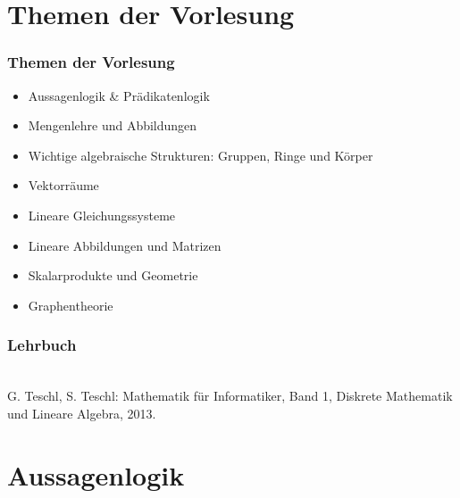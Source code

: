 \section{Themen der Vorlesung}
%
\begin{frame}\frametitle{Themen der Vorlesung}
	
	\begin{itemize}
		\item Aussagenlogik \& Prädikatenlogik
		\item Mengenlehre und Abbildungen
		\item Wichtige algebraische Strukturen: Gruppen, Ringe und Körper
		\item Vektorräume
		\item Lineare Gleichungssysteme
		\item Lineare Abbildungen und Matrizen
		\item Skalarprodukte und Geometrie
		\item Graphentheorie
	\end{itemize}
	
\end{frame}
%
%
\begin{frame}\frametitle{Lehrbuch}
	
	\highlightDef{[Teschl]}\\ 
	G. Teschl, S. Teschl: Mathematik für Informatiker, 
	Band 1, 
	Diskrete Mathematik und Lineare Algebra, 
	2013.
	
\end{frame}
%
\section{Aussagenlogik}
%
